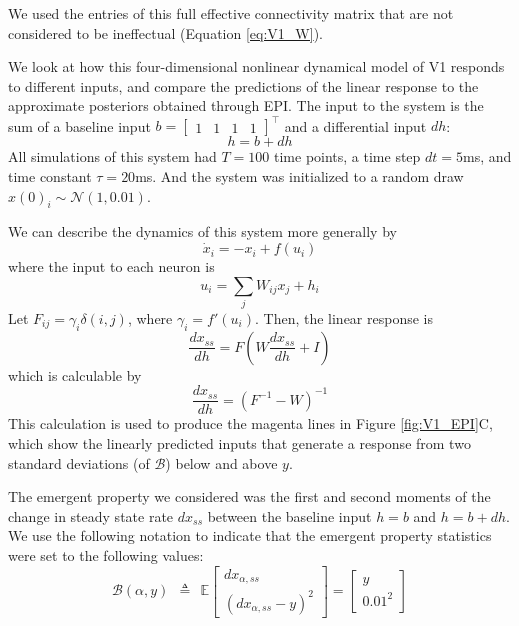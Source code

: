 \documentclass[11pt]{article}
\begin{document}
We used the entries of this full effective connectivity matrix that are not considered to be ineffectual (Equation \ref{eq:V1_W}).

We look at how this four-dimensional nonlinear dynamical model of V1 responds to different inputs, and compare the predictions of the linear response to the approximate posteriors obtained through EPI.  The input to the system is the sum of a baseline input $b = \begin{bmatrix} 1 & 1 & 1 & 1 \end{bmatrix}^\top$ and a differential input $dh$:
\begin{equation}
h = b + dh
\end{equation}
All simulations of this system had $T=100$ time points, a time step $dt = 5$ms, and time constant $\tau = 20$ms.  And the system was initialized to a random draw $x(0)_i \sim \mathcal{N}(1, 0.01)$.

We can describe the dynamics of this system more generally by
\begin{equation}
\dot{x}_i = -x_i + f(u_i)
\end{equation}
where the input to each neuron is
\begin{equation}
u_i = \sum_j W_{ij} x_j + h_i
\end{equation}
Let $F_{ij} = \gamma_i \delta(i,j)$, where $\gamma_i = f'(u_i)$.  Then, the linear response is
\begin{equation}
\frac{dx_{ss}}{dh} = F(W\frac{dx_{ss}}{dh} + I)
\end{equation}
which is calculable by
\begin{equation}
\frac{dx_{ss}}{dh} = (F^{-1} - W)^{-1}
\end{equation}
This calculation is used to produce the magenta lines in Figure \ref{fig:V1_EPI}C, which show the linearly predicted inputs that generate a response from two standard deviations (of $\mathcal{B}$) below and above $y$.

The emergent property we considered was the first and second moments of the change in steady state rate $dx_{ss}$ between the baseline input $h= b$ and $h = b + dh$.  We use the following notation to indicate that the emergent property statistics were set to the following values:
\begin{equation}
\mathcal{B}(\alpha, y) ~~\triangleq~~ 
\mathbb{E} \begin{bmatrix} dx_{\alpha,ss} \\ (dx_{\alpha,ss} - y)^2 \end{bmatrix} = \begin{bmatrix} y \\ 0.01^2 \end{bmatrix}
\end{equation}
\end{document}
